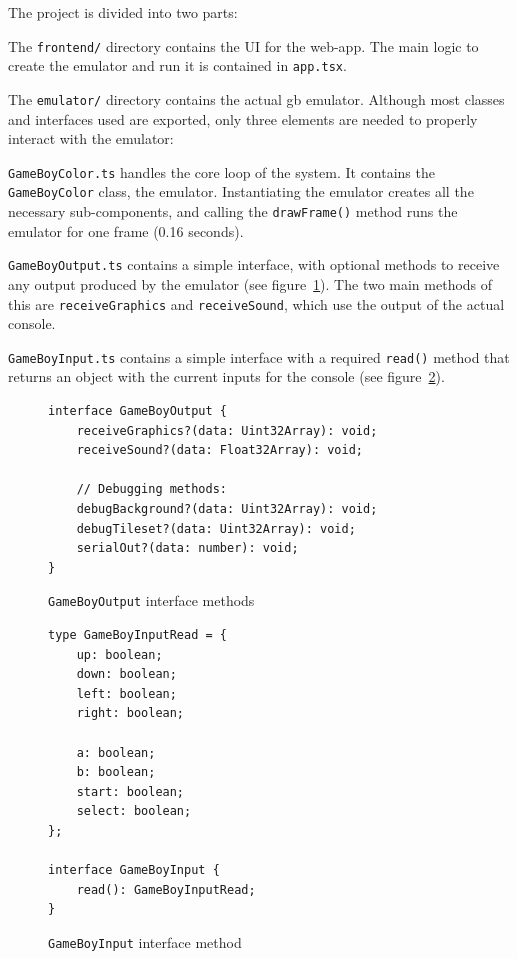 \documentclass[11pt]{report}
\begin{document}
The project is divided into two parts:
\begin{compactitem}
    \item The \texttt{frontend/} directory contains the UI for the web-app. The main logic to create the emulator and run it is contained in \texttt{app.tsx}.
    \item  The \texttt{emulator/} directory contains the actual \gls{gb} emulator. Although most classes and interfaces used are exported, only three elements are needed to properly interact with the emulator:
    \begin{compactitem}
        \item \texttt{GameBoyColor.ts} handles the core loop of the system. It contains the \texttt{GameBoyColor} class, the emulator. Instantiating the emulator creates all the necessary sub-components, and calling the \texttt{drawFrame()} method runs the emulator for one frame (0.16 seconds).
        \item \texttt{GameBoyOutput.ts} contains a simple interface, with optional methods to receive any output produced by the emulator (see figure~\ref{fig:gameboyoutput}). The two main methods of this are \texttt{receiveGraphics} and \texttt{receiveSound}, which use the output of the actual console.
        \item \texttt{GameBoyInput.ts} contains a simple interface with a required \texttt{read()} method that returns an object with the current inputs for the console (see figure~\ref{fig:gameboyinput}).
    \end{compactitem}
\end{compactitem}

\begin{figure}[h]
    \begin{verbatim}
interface GameBoyOutput {
    receiveGraphics?(data: Uint32Array): void;
    receiveSound?(data: Float32Array): void;

    // Debugging methods:
    debugBackground?(data: Uint32Array): void;
    debugTileset?(data: Uint32Array): void;
    serialOut?(data: number): void;
}
    \end{verbatim}
    \caption{\texttt{GameBoyOutput} interface methods}
    \label{fig:gameboyoutput}
\end{figure}

\begin{figure}[h]
    \begin{verbatim}
type GameBoyInputRead = {
    up: boolean;
    down: boolean;
    left: boolean;
    right: boolean;

    a: boolean;
    b: boolean;
    start: boolean;
    select: boolean;
};

interface GameBoyInput {
    read(): GameBoyInputRead;
}
    \end{verbatim}
    \caption{\texttt{GameBoyInput} interface method}
    \label{fig:gameboyinput}
\end{figure}
\end{document}
